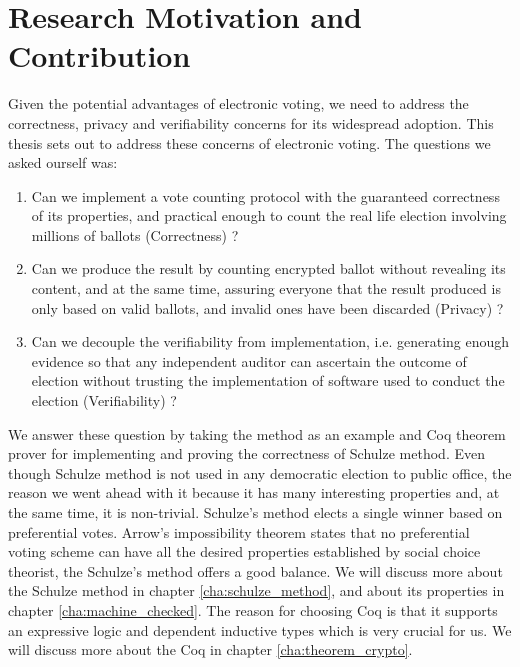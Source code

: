 \section{Research Motivation and Contribution}
Given the potential advantages of electronic voting,  we need to address
the correctness, privacy and verifiability concerns for its widespread adoption. 
This thesis sets out to address these concerns of electronic voting. 
The questions we asked ourself was:
 \begin{enumerate} 
  \item Can we implement a vote counting protocol with the  
    guaranteed correctness of its properties, and practical enough
    to count the real life election involving millions of ballots (Correctness) ?
  \item Can we produce the result by counting encrypted ballot without revealing 
  its content, and at the same time, 
  assuring everyone that the result produced is only based on valid ballots, 
  and invalid ones have been discarded  (Privacy) ?
 \item Can we decouple the verifiability from implementation, i.e. 
    generating enough evidence so that any independent auditor can 
    ascertain the outcome of election without trusting the implementation 
    of software used to conduct the election (Verifiability) ?
  \end{enumerate}

\noindent
We answer these question by taking the \cite{Schulze:2011:NMC} 
method as an example and Coq \citep{Bertot:2004:ITP}
theorem prover  for implementing and proving the correctness of  Schulze method.
Even though Schulze method is not used in any democratic election to public office, the reason 
 we went ahead with it because it has many interesting properties and, 
 at the same time, it is non-trivial.   Schulze's method elects  a single winner based on 
preferential votes.  Arrow's impossibility theorem \citep{Arrow:1950:DCS} states
 that no preferential voting 
scheme can have all the desired properties established by  social choice theorist,
the Schulze's method offers a good balance. We will discuss more about the Schulze method in 
chapter \ref{cha:schulze_method}, and about its properties in chapter \ref{cha:machine_checked}. 
The reason for choosing Coq is that it supports an expressive logic and dependent 
inductive types which is very crucial for us. We will discuss more about the Coq in 
chapter \ref{cha:theorem_crypto}.

